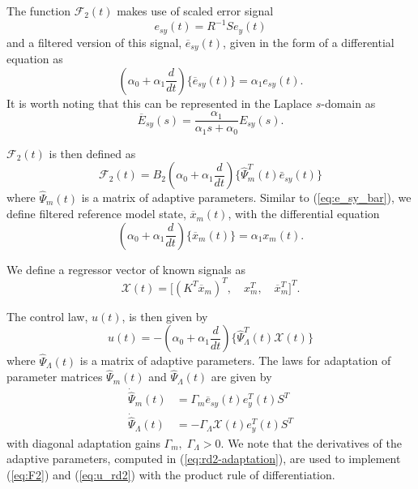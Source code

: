 The function $\mathcal{F}_2(t)$ makes use of scaled error signal
\begin{equation}
	e_{sy}(t) = R^{-1} S e_y(t) \label{eq:esy}
\end{equation}
and a filtered version of this signal, $\overline{e}_{sy}(t)$, given in the form of a differential equation as
\begin{equation}
(\alpha_0 + \alpha_1 \frac{d}{dt}) \big\{ \overline{e}_{sy}(t) \big\} = \alpha_1 e_{sy}(t). \label{eq:e_sy_bar}
\end{equation}
It is worth noting that this can be represented in the Laplace $s$-domain as
\begin{equation*}
	\overline{E}_{sy}(s) = \frac{\alpha_1}{\alpha_1 s + \alpha_0} E_{sy}(s).
\end{equation*}

$\mathcal{F}_2(t)$ is then defined as
\begin{equation}
\mathcal{F}_2(t) = B_2 (\alpha_0 + \alpha_1 \frac{d}{dt})\big\{ \hat{\Psi}_m^T (t) \bar{e}_{sy}(t) \big\} \label{eq:F2}
\end{equation}
where $\hat{\Psi}_m(t)$ is a matrix of adaptive parameters. Similar to (\ref{eq:e_sy_bar}), we define filtered reference model state, $\overline{x}_m(t)$, with the differential equation
\begin{equation}
(\alpha_0 + \alpha_1 \frac{d}{dt}) \big\{ \overline{x}_{m}(t) \big\} = \alpha_1 x_{m}(t). \label{eq:xm_bar}
\end{equation}

We define a regressor vector of known signals as
\begin{equation}
\mathcal{X}(t) = \big[ (K^T \overline{x}_m)^T,\quad x_m^T,\quad \overline{x}_m^T \big]^T.
\end{equation}

The control law, $u(t)$, is then given by
\begin{equation}
u(t) = - (\alpha_0 + \alpha_1 \frac{d}{dt}) \big \{ \hat{\Psi}_{\Lambda}^T (t) \mathcal{X}(t) \big\} \label{eq:u_rd2}	
\end{equation}
where $\hat{\Psi}_{\Lambda}(t)$ is a matrix of adaptive parameters. The laws for adaptation of parameter matrices $\hat{\Psi}_m(t)$ and $\hat{\Psi}_{\Lambda}(t)$ are given by
\begin{equation}
\begin{aligned}
	\dot{\hat{\Psi}}_m(t) &= \Gamma_{m} \overline{e}_{sy}(t) e_y^T(t) S^T \\
	\dot{\hat{\Psi}}_{\Lambda}(t) &= -\Gamma_{\Lambda} \mathcal{X}(t) e_y^T (t) S^T
\end{aligned} \label{eq:rd2-adaptation}
\end{equation}
with diagonal adaptation gains $\Gamma_{m}, \;\Gamma_{\Lambda} > 0$. We note that the derivatives of the adaptive parameters, computed in (\ref{eq:rd2-adaptation}), are used to implement (\ref{eq:F2}) and (\ref{eq:u_rd2}) with the product rule of differentiation.

